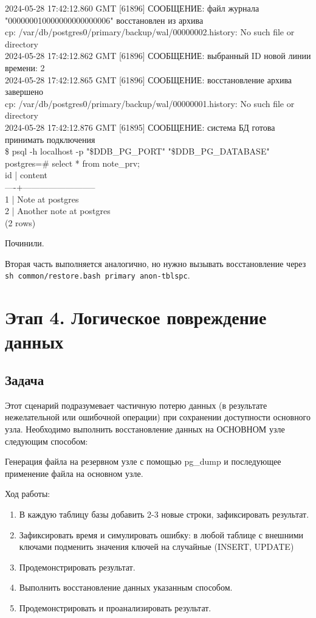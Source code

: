 \documentclass{article}
\begin{document}
{2024-05-28 17:42:12.860 GMT [61896] СООБЩЕНИЕ:  файл журнала "000000010000000000000006" восстановлен из архива\\
cp: /var/db/postgres0/primary/backup/wal/00000002.history: No such file or directory\\
2024-05-28 17:42:12.862 GMT [61896] СООБЩЕНИЕ:  выбранный ID новой линии времени: 2\\
2024-05-28 17:42:12.865 GMT [61896] СООБЩЕНИЕ:  восстановление архива завершено\\
cp: /var/db/postgres0/primary/backup/wal/00000001.history: No such file or directory\\
2024-05-28 17:42:12.876 GMT [61895] СООБЩЕНИЕ:  система БД готова принимать подключения\\
\$ psql -h localhost -p "\$DDB\_PG\_PORT" "\$DDB\_PG\_DATABASE"\\
postgres=\# select * from note\_prv;\\
 id |         content          \\
----+--------------------------\\
  1 | Note at postgres\\
  2 | Another note at postgres\\
(2 rows)
}

Починили.

Вторая часть выполняется аналогично, но нужно вызывать восстановление через \texttt{sh common/restore.bash primary anon-tblspc}.

\section{Этап 4. Логическое повреждение данных}

\subsection{Задача}

Этот сценарий подразумевает частичную потерю данных (в результате нежелательной или ошибочной операции) при сохранении доступности основного узла. Необходимо выполнить восстановление данных на ОСНОВНОМ узле следующим способом:

Генерация файла на резервном узле с помощью pg\_dump и последующее применение файла на основном узле.

Ход работы:

\begin{enumerate}
    \item В каждую таблицу базы добавить 2-3 новые строки, зафиксировать результат.
    \item Зафиксировать время и симулировать ошибку: в любой таблице с внешними ключами подменить значения ключей на случайные (INSERT, UPDATE)
    \item Продемонстрировать результат.
    \item Выполнить восстановление данных указанным способом.
    \item Продемонстрировать и проанализировать результат.
\end{enumerate}
\end{document}
